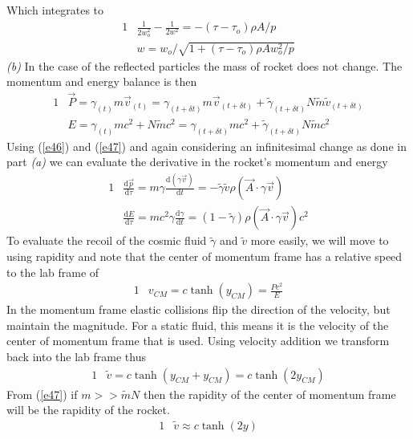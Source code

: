 \documentclass[]{article}
\numberwithin{equation}{subsection}
\begin{document}
Which integrates to
\begin{alignat}{1}
	\label{e44}	&\frac{1}{2w_{o}^{2}}-\frac{1}{2w^{2}}=-(\tau-\tau_{o})\rho A/p\\
	\label{e45}	&w=w_{o}/\sqrt{1+(\tau-\tau_{o})\rho Aw_{o}^{2}/p}	
\end{alignat}
\emph{(b)} In the case of the reflected particles the mass of rocket does not change. The momentum and energy balance is then 
\begin{alignat}{1}
	\label{e46}	&\vec{P}=\gamma_{(t)}m\vec{v}_{(t)}=\gamma_{(t+\delta t)}m\vec{v}_{(t+\delta t)}+\tilde{\gamma}_{(t+\delta t)}N\tilde{m}\tilde{v}_{(t+\delta t)}\\
	\label{e47}	&E=\gamma_{(t)}mc^{2}+N\tilde{m}c^{2}=\gamma_{(t+\delta t)}mc^{2}+\tilde{\gamma}_{(t+\delta t)}N\tilde{m}c^{2}
\end{alignat}
Using (\ref{e46}) and (\ref{e47}) and again considering an infinitesimal change as done in part \emph{(a)} we can evaluate the derivative in the rocket's momentum and energy  
\begin{alignat}{1}
	\label{e48}	&\frac{\mathrm{d}\vec{p}}{\mathrm{d}\tau}=m\gamma\frac{\mathrm{d}(\gamma\vec{v})}{\mathrm{d}t}=-\tilde{\gamma}\tilde{v}\rho(\vec{A}\cdot\gamma\vec{v})\\
	\label{e49}&\frac{\mathrm{d}E}{\mathrm{d}\tau}=mc^{2}\gamma\frac{\mathrm{d}\gamma}{\mathrm{d}t}=(1-\tilde{\gamma})\rho(\vec{A}\cdot\gamma\vec{v})c^{2}
\end{alignat}
To evaluate the recoil of the cosmic fluid $\tilde{\gamma}$ and $\tilde{v}$ more easily, we will move to using rapidity and note that the center of momentum frame has a relative speed to the lab frame of  
\begin{alignat}{1}
	\label{e50}	&v_{CM}=c\tanh(y_{CM})=\frac{Pc^{2}}{E}
\end{alignat}
In the momentum frame elastic collisions flip the direction of the velocity, but maintain the magnitude. For a static fluid, this means it is the velocity of the center of momentum frame that is used. Using velocity addition we transform back into the lab frame thus  
\begin{alignat}{1}
	\label{e51}	&\tilde{v}=c\tanh(y_{CM}+y_{CM})=c\tanh(2y_{CM})
\end{alignat}
From (\ref{e47}) if $m>>\tilde{m}N$ then the rapidity of the center of momentum frame will be the rapidity of the rocket.
\begin{alignat}{1}
	\label{e52}	&\tilde{v}\approx c\tanh(2y)
\end{alignat}
\end{document}

